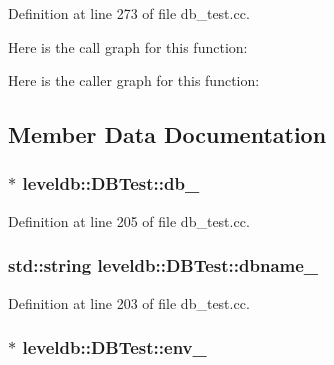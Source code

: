 Definition at line 273 of file db\+\_\+test.\+cc.



Here is the call graph for this function\+:




Here is the caller graph for this function\+:




\subsection{Member Data Documentation}
\hypertarget{classleveldb_1_1_d_b_test_a2c3db8773f1aa15128432a87489b0d5a}{}
\subsubsection[{db\+\_\+}]{$\ast$ leveldb\+::\+D\+B\+Test\+::db\+\_\+}\label{classleveldb_1_1_d_b_test_a2c3db8773f1aa15128432a87489b0d5a}


Definition at line 205 of file db\+\_\+test.\+cc.

\hypertarget{classleveldb_1_1_d_b_test_ab7eb9815f522ad154816d72d1cc23a86}{}
\subsubsection[{dbname\+\_\+}]{\setlength{\rightskip}{0pt plus 5cm}std\+::string leveldb\+::\+D\+B\+Test\+::dbname\+\_\+}\label{classleveldb_1_1_d_b_test_ab7eb9815f522ad154816d72d1cc23a86}


Definition at line 203 of file db\+\_\+test.\+cc.

\hypertarget{classleveldb_1_1_d_b_test_ae6bb66675fe5419ed647efd1bfd332f8}{}
\subsubsection[{env\+\_\+}]{$\ast$ leveldb\+::\+D\+B\+Test\+::env\+\_\+}\label{classleveldb_1_1_d_b_test_ae6bb66675fe5419ed647efd1bfd332f8}


